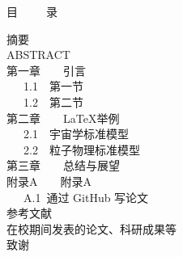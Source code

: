 \newpage
\pagestyle{fancy}
\thispagestyle{empty}
 \vspace{1.0cm}
 \centerline{\hei \sanhao 目\ \ \ \ \ 录}
\vspace{0.5cm} \label{content} \noindent
{\hei \xiaosihao 摘要 \dotfill \pageref{zhaiyao}}\\[0.2cm]
{\hei \xiaosihao ABSTRACT \dotfill \pageref{abs}}\\[0.2cm]
{\hei \xiaosihao 第一章\ \ \ \ 引言 \dotfill \pageref{1}}\\[0.2cm]
\hspace*{0.5cm} \ \  \ 1.1\ \  第一节\dotfill \pageref{1.1}\\
\hspace*{0.5cm} \ \  \ 1.2\ \  第二节\dotfill \pageref{1.2}\\[0.2cm] %
{\hei \xiaosihao 第二章\ \ \ \ \LaTeX 举例 \dotfill \pageref{2}}\\[0.2cm]
\hspace*{0.5cm} \ \  \ 2.1\ \  宇宙学标准模型\dotfill \pageref{2.1}\\
\hspace*{0.5cm} \ \  \ 2.2\ \  粒子物理标准模型\dotfill \pageref{2.2}\\[0.2cm]
{\hei \xiaosihao 第三章\ \ \ \ 总结与展望 \dotfill \pageref{3}}\\[0.2cm]
{\hei \xiaosihao 附录A\ \ \ \ 附录A \dotfill \pageref{A}}\\
\hspace*{0.5cm} \ \  \ A.1\ 通过 GitHub 写论文\dotfill \pageref{A.1}\\[0.2cm]
{\hei \xiaosihao 参考文献 \dotfill \pageref{bib}}\\[0.2cm]
{\hei \xiaosihao 在校期间发表的论文、科研成果等\dotfill \pageref{work}} \\[0.2cm]
{\hei \xiaosihao 致谢\dotfill \pageref{acknowlegement}}